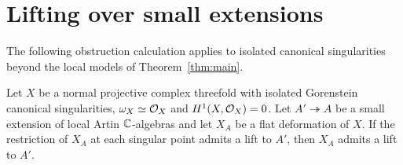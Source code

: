 \section{Lifting over small extensions}\label{sec:lifting}

The following obstruction calculation applies to isolated canonical
singularities beyond the local models of Theorem~\ref{thm:main}.

\begin{lemma}\label{lem:obstruction}
Let $X$ be a normal projective complex threefold with isolated Gorenstein
canonical singularities, $\omega_X\simeq\mathcal O_X$ and $H^1(X,\mathcal O_X)=0$.
Let $A'\twoheadrightarrow A$ be a small extension of local Artin
$\mathbb C$-algebras and let $X_A$ be a flat deformation of $X$.
If the restriction of $X_A$ at each singular point admits a lift to $A'$,
then $X_A$ admits a lift to $A'$.
\end{lemma}


